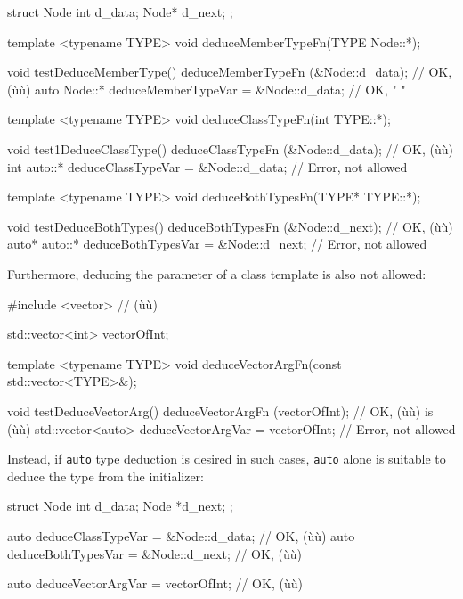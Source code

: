 \begin{emcppslisting}
struct Node
{
    int   d_data;
    Node* d_next;
};

template <typename TYPE>
void deduceMemberTypeFn(TYPE Node::*);

void testDeduceMemberType()
{
                 deduceMemberTypeFn   (&Node::d_data);  // OK, (ù{}ù)
    auto Node::* deduceMemberTypeVar = &Node::d_data;   // OK,  "     "
}

template <typename TYPE>
void deduceClassTypeFn(int TYPE::*);

void test1DeduceClassType()
{
                deduceClassTypeFn   (&Node::d_data);  // OK, (ù{}ù)
    int auto::* deduceClassTypeVar = &Node::d_data;   // Error, not allowed
}

template <typename TYPE>
void deduceBothTypesFn(TYPE* TYPE::*);

void testDeduceBothTypes()
{
                  deduceBothTypesFn   (&Node::d_next);  // OK, (ù{}ù)
    auto* auto::* deduceBothTypesVar = &Node::d_next;   // Error, not allowed
}
\end{emcppslisting}

\noindent Furthermore, deducing the parameter of a class template is also not
allowed:

\begin{emcppshiddenlisting}[emcppsbatch=e22]
#include <vector>     // (ù{}ù)
\end{emcppshiddenlisting}
\begin{emcppslisting}[emcppsbatch=e22]
std::vector<int> vectorOfInt;

template <typename TYPE>
void deduceVectorArgFn(const std::vector<TYPE>&);

void testDeduceVectorArg()
{
                      deduceVectorArgFn   (vectorOfInt); // OK, (ù{}ù) is (ù{}ù)
    std::vector<auto> deduceVectorArgVar = vectorOfInt;  // Error, not allowed
}
\end{emcppslisting}

\noindent Instead, if \lstinline!auto! type deduction is desired in such cases,
\lstinline!auto! alone is suitable to deduce the type from the initializer:

\begin{emcppshiddenlisting}[emcppsbatch=e22]
struct Node {
int d_data;
Node *d_next;
};
\end{emcppshiddenlisting}
\begin{emcppslisting}[emcppsbatch=e22]
auto deduceClassTypeVar = &Node::d_data;  // OK, (ù{}ù)
auto deduceBothTypesVar = &Node::d_next;  // OK, (ù{}ù)

auto deduceVectorArgVar = vectorOfInt;    // OK, (ù{}ù)
\end{emcppslisting}


